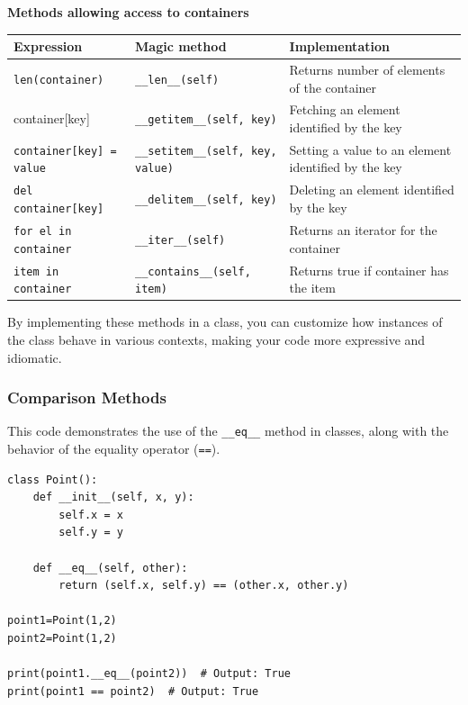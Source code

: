 \vspace{0.5cm}

\textbf{Methods allowing access to containers}\\[0.1cm]
\begin{tabular}{|p{4.5cm}|p{6cm}|p{4.5cm}|}
\hline
\textbf{Expression} & \textbf{Magic method} & \textbf{Implementation} \\
\hline
\texttt{len(container)} & \texttt{\_\_len\_\_(self)} & Returns number of elements of the container \\
container[key] & \texttt{\_\_getitem\_\_(self, key)} & Fetching an element identified by the key\\
\texttt{container[key] = value} & \texttt{\_\_setitem\_\_(self, key, value)} & Setting a value to an element identified by the key\\
\texttt{del container[key]} & \texttt{\_\_delitem\_\_(self, key)} & Deleting an element identified by the key\\
\texttt{for el in container} & \texttt{\_\_iter\_\_(self)} & Returns an iterator for the container \\
\texttt{item in container} & \texttt{\_\_contains\_\_(self, item)} & Returns true if container has the item \\
\hline
\end{tabular}

\vspace{0.5cm}





By implementing these methods in a class, you can customize how instances of the class behave in various contexts, making your code more expressive and idiomatic.

\newpage
\subsubsection{Comparison Methods}

This code demonstrates the use of the \texttt{\_\_eq\_\_} method in classes, along with the behavior of the equality operator (\texttt{==}).

\begin{codebox}
\begin{verbatim}
class Point():
    def __init__(self, x, y):
        self.x = x
        self.y = y
        
    def __eq__(self, other):
        return (self.x, self.y) == (other.x, other.y)

point1=Point(1,2)
point2=Point(1,2)

print(point1.__eq__(point2))  # Output: True
print(point1 == point2)  # Output: True
\end{verbatim}
\end{codebox}

